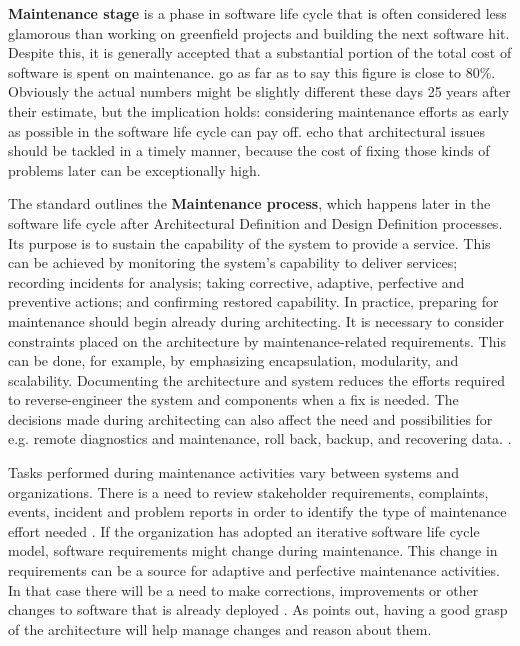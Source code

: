 \documentclass[utf8,english]{gradu3}
\begin{document}
\textbf{Maintenance stage} is a phase in software life cycle that is often
considered less glamorous than working on greenfield projects and building the
next software hit. Despite this, it is generally accepted that a substantial
portion of the total cost of software is spent on maintenance.
\textcite[32]{Bass1998} go as far as to say this figure is close to 80\%.
Obviously the actual numbers might be slightly different these days 25 years
after their estimate, but the implication holds: considering maintenance efforts
as early as possible in the software life cycle can pay off.
\textcite[1]{Mumtaz2021} echo that architectural issues should be tackled in a
timely manner, because the cost of fixing those kinds of problems later can be
exceptionally high.

The standard \textcite{IEEE12207} outlines the \textbf{Maintenance process}, which
happens later in the software life cycle after Architectural Definition and Design
Definition processes. Its purpose is to sustain the capability of the system to
provide a service. This can be achieved by monitoring the system's capability to
deliver services; recording incidents for analysis; taking corrective, adaptive,
perfective and preventive actions; and confirming restored capability. In
practice, preparing for maintenance should begin already during architecting. It
is necessary to consider constraints placed on the architecture by
maintenance-related requirements. This can be done, for example, by emphasizing
encapsulation, modularity, and scalability. Documenting the architecture and
system reduces the efforts required to reverse-engineer the system and
components when a fix is needed. The decisions made during architecting can also
affect the need and possibilities for e.g. remote diagnostics and maintenance,
roll back, backup, and recovering data. \parencite[95-96]{IEEE12207}.

Tasks performed during maintenance activities vary between systems and
organizations. There is a need to review stakeholder requirements, complaints,
events, incident and problem reports in order to identify the type of
maintenance effort needed \parencite{IEEE12207}. If the organization has adopted
an iterative software life cycle model, software requirements might change
during maintenance. This change in requirements can be a source for adaptive and
perfective maintenance activities. In that case there will be a need to make
corrections, improvements or other changes to software that is already deployed
\parencite[97]{IEEE12207}. As \textcite[32]{Bass1998} points out, having a good
grasp of the architecture will help manage changes and reason about them.
\end{document}
